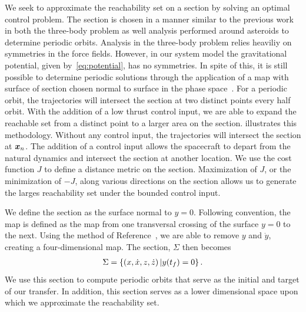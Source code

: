 \documentclass[]{aiaa-tc}%
\begin{document}
We seek to approximate the reachability set on a \Poincare section by solving an optimal control problem.
The \Poincare section is chosen in a manner similar to the previous work in both the three-body problem as well analysis performed around asteroids to determine periodic orbits.
Analysis in the three-body problem relies heaviliy on symmetries in the force fields.
However, in our system model the gravitational potential, given by~\cref{eq:potential}, has no symmetries.
In spite of this, it is still possible to determine periodic solutions through the application of a \Poincare map with surface of section chosen normal to surface in the phase space~\cite{scheeres2000}.
For a periodic orbit, the trajectories will intersect the \Poincare section at two distinct points every half orbit.
With the addition of a low thrust control input, we are able to expand the reachable set from a distinct point to a larger area on the \Poincare section.
 illustrates this methodology.
Without any control input, the trajectories will intersect the \Poincare section at \( \bm{x}_n\).
The addition of a control input allows the spacecraft to depart from the natural dynamics and intersect the section at another location.
We use the cost function \( J \) to define a distance metric on the \Poincare section.
Maximization of \( J \), or the minimization of \( -J \), along various directions on the \Poincare section allows us to generate the larges reachability set under the bounded control input.

We define the \Poincare section as the surface normal to \( y = 0 \).
Following convention, the \Poincare map is defined as the map from one transversal crossing of the surface \( y = 0\) to the next.
Using the method of Reference~, we are able to remove \( y \) and \( \dot{y} \), creating a four-dimensional map.
The \Poincare section, \( \Sigma \) then becomes
\begin{align}\label{eq:poincare_section}
    \Sigma = \left\{ \left( x, \dot{x}, z, \dot{z} \right) | y(t_f) = 0  \right\}.
\end{align}
We use this section to compute periodic orbits that serve as the initial and target of our transfer.
In addition, this section serves as a lower dimensional space upon which we approximate the reachability set.
\end{document}
